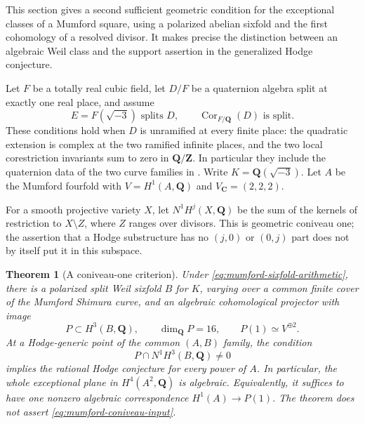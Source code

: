 \documentclass[11pt]{article}
\newtheorem{theorem}{Theorem}[section]
\theoremstyle{definition}
\theoremstyle{remark}
\begin{document}
This section gives a second sufficient geometric condition for the
exceptional classes of a Mumford square, using a polarized abelian
sixfold and the first cohomology of a resolved divisor.
It makes precise the distinction between an algebraic Weil class and
the support assertion in the generalized Hodge conjecture.

Let $F$ be a totally real cubic field, let $D/F$ be a quaternion algebra
split at exactly one real place, and assume
\begin{equation}
 E=F(\sqrt{-3})\text{ splits }D,
 \qquad \operatorname{Cor}_{F/\mathbf Q}(D)\text{ is split}.
 \label{eq:mumford-sixfold-arithmetic}
\end{equation}
These conditions hold when $D$ is unramified at every finite place:
the quadratic extension is complex at the two ramified infinite places,
and the two local corestriction invariants sum to zero in
$\mathbf Q/\mathbf Z$.  In particular they include the quaternion
data of the two curve families in \cite[Theorem~1.2]{BHPS}.
Write $K=\mathbf Q(\sqrt{-3})$.  Let $A$ be the Mumford fourfold
with $V=H^1(A,\mathbf Q)$ and $V_{\mathbf C}=(2,2,2)$.

For a smooth projective variety $X$, let $N^1H^j(X,\mathbf Q)$ be the
sum of the kernels of restriction to $X\setminus Z$, where $Z$ ranges
over divisors.  This is geometric coniveau one; the assertion that a
Hodge substructure has no $(j,0)$ or $(0,j)$ part does not by itself
put it in this subspace.

\begin{theorem}[A coniveau-one criterion]\label{thm:mumford-coniveau}
Under \eqref{eq:mumford-sixfold-arithmetic}, there is a polarized split
Weil sixfold $B$ for $K$, varying over a common finite cover of the
Mumford Shimura curve, and an algebraic cohomological projector with
image
\[
 P\subset H^3(B,\mathbf Q),\qquad \dim_{\mathbf Q}P=16,
 \qquad P(1)\simeq V^{\oplus2}.
\]
At a Hodge-generic point of the common $(A,B)$ family, the condition
\begin{equation}
 P\cap N^1H^3(B,\mathbf Q)\ne0
 \label{eq:mumford-coniveau-input}
\end{equation}
implies the rational Hodge conjecture for every power of $A$.
In particular, the whole exceptional plane in $H^4(A^2,\mathbf Q)$ is
algebraic.  Equivalently, it suffices to have one nonzero algebraic
correspondence $H^1(A)\longrightarrow P(1)$.
The theorem does not assert \eqref{eq:mumford-coniveau-input}.
\end{theorem}
\end{document}

